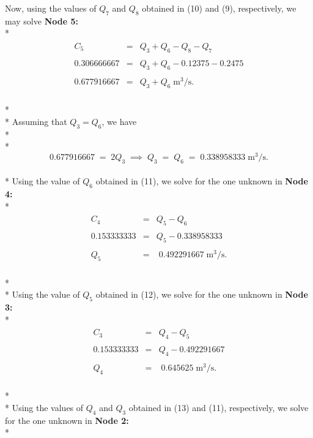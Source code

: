\documentclass[]{article}
\begin{document}
Now, using the values of $Q_7$ and $Q_8$ obtained in (10) and (9), respectively, we may solve \textbf{Node 5:} \\* 
\begin{align}
\nonumber
\begin{array}{rcl}
C_5 &=& Q_3+Q_6-Q_8-Q_7 \\ \\
0.306666667 &=&  Q_3+Q_6 - 0.12375 - 0.2475 \\ \\
0.677916667 &=& Q_3+Q_6 \; \text{m}^3/\text{s}.
\end{array} 
\end{align}\\* \\* 
Assuming that $Q_3 = Q_{6}$, we have \\* \\*
\begin{equation}
0.677916667 \; = \; 2Q_3 \; \implies \; Q_3 \; = \; Q_{6} \; = \; 0.338958333
\; \text{m}^3/\text{s}.
\end{equation} \\* 
Using the value of $Q_6$ obtained in (11), we solve for the one unknown in \textbf{Node 4:} \\*
\begin{align}
\begin{array}{rcl}
C_4 &=& Q_5-Q_6 \\ \\
0.153333333 &=&  Q_5 - 0.338958333 \\ \\ 
Q_5 &=& \; 0.492291667 \; \text{m}^3/\text{s}.
\end{array} 
\end{align} \\* \\* 
Using the value of $Q_5$ obtained in (12), we solve for the one unknown in \textbf{Node 3:} \\*
\begin{align}
\begin{array}{rcl}
C_3 &=& Q_4-Q_5 \\ \\
0.153333333 &=&  Q_4 - 0.492291667 \\ \\ 
Q_4 &=& \; 0.645625 \; \text{m}^3/\text{s}.
\end{array} 
\end{align} \\* \\* 
Using the values of $Q_4$ and $Q_3$ obtained in (13) and (11), respectively, we solve for the one unknown in \textbf{Node 2:} \\*
\end{document}
